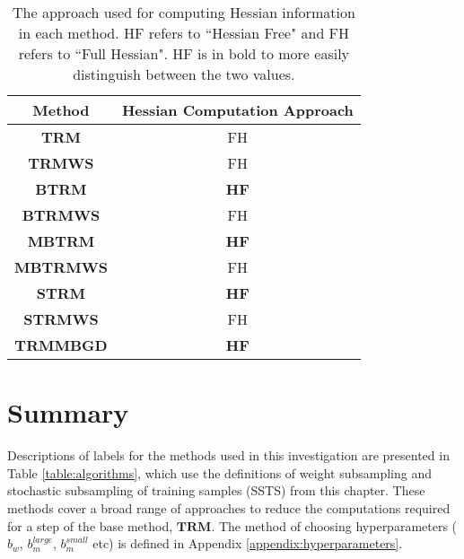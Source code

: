 \documentclass[letterpaper,12pt,titlepage,oneside,final]{book}
\begin{document}
	
	\begin{table}[h]
		\begin{center}
			\begin{tabular}{ |c|c| }  
				\hline
				\textbf{Method} & \textbf{Hessian Computation Approach}  \\
				\hline 
				\textbf{TRM} & FH\\
				\textbf{TRMWS} & FH\\
				\textbf{BTRM} & \textbf{HF}\\
				\textbf{BTRMWS} & FH \\
				\textbf{MBTRM} & \textbf{HF} \\ 
				\textbf{MBTRMWS} & FH \\
				\textbf{STRM} &\textbf{HF} \\
				\textbf{STRMWS} & FH \\
				\textbf{TRMMBGD} &\textbf{HF} \\
				\hline
			\end{tabular}
			\caption{The approach used for computing Hessian information in each method. HF refers to ``Hessian Free" and FH refers to ``Full Hessian". HF is in bold to more easily distinguish between the two values. }
			\label{table:FHHF}
		\end{center}
	\end{table}
	
	
	\section{Summary}
	
	Descriptions of labels for the methods used in this investigation are presented in Table \ref{table:algorithms}, which use the definitions of weight subsampling and stochastic subsampling of training samples (SSTS) from this chapter. These methods cover a broad range of approaches to reduce the computations required for a step of the base method, $\mathbf{TRM}$. The method of choosing hyperparameters ($b_{w}$, $b_{m}^{large}$, $b_{m}^{small}$ etc) is defined in Appendix \ref{appendix:hyperparameters}.
	
\end{document}
